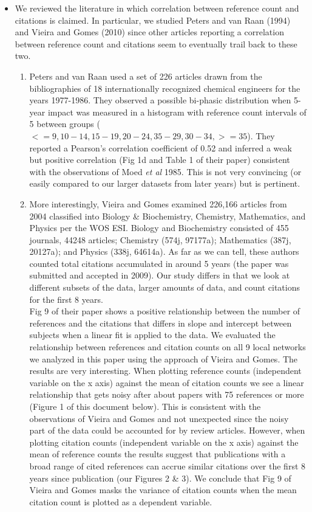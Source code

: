 \documentclass[11pt, oneside]{article}   	%
\begin{document}
\begin{itemize}
 \item We reviewed the literature in which correlation between reference count and citations is claimed. In particular, we studied Peters and van Raan (1994) and Vieira and Gomes (2010) since other articles reporting a correlation between reference count and citations seem to eventually trail back to these two. 
\begin{enumerate}
\item Peters and van Raan used a set of 226 articles drawn from the bibliographies of 18 internationally recognized chemical engineers for the years 1977-1986. They observed a possible bi-phasic distribution when 5-year impact was measured in a histogram with reference count intervals of 5 between groups ($<=9, 10-14, 15-19, 20-24, 35-29, 30-34, >=35$). They reported a Pearson's correlation coefficient of 0.52 and inferred a weak but positive correlation (Fig 1d and Table 1 of their paper) consistent with the observations of Moed \emph{et al} 1985. This is not very convincing (or easily compared to our larger datasets from later years) but is pertinent. 

\item More interestingly, Vieira and Gomes examined 226,166 articles from 2004 classified into Biology \& Biochemistry, Chemistry, Mathematics, and Physics per the WOS ESI. Biology and Biochemistry consisted of 455 journals, 44248 articles; Chemistry (574j, 97177a); Mathematics (387j, 20127a); and Physics (338j, 64614a). As far as we can tell, these authors counted total citations accumulated in around 5 years (the paper was submitted and accepted in 2009).  Our study differs in that we look at different subsets of the data, larger amounts of data, and count citations for the first 8 years. \\
\vspace{3mm}
Fig 9 of their paper shows a positive relationship between the number of references and the citations that differs in slope and intercept between subjects when a linear fit is applied to the data.  We evaluated the relationship between references and citation counts on all 9 local networks we analyzed in this paper using the approach of Vieira and Gomes. The results are very interesting. When plotting reference counts (independent variable on the x axis) against the mean of citation counts we see a linear relationship that gets noisy after about papers with 75 references or more (Figure 1 of this document below). This is consistent with the observations of Vieira and Gomes and not unexpected since the noisy part of the data could be accounted for by review articles. However, when plotting citation counts (independent variable on the x axis) against the mean of reference counts the results suggest that publications with a broad range of cited references can accrue similar citations over the first 8 years since publication (our Figures 2 \& 3). We conclude that Fig 9 of Vieira and Gomes masks the variance of citation counts when the mean citation count is plotted as a dependent variable. 


\end{enumerate}
\end{itemize}
\end{document}
